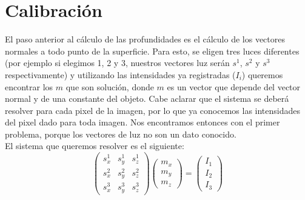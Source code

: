 

\section{Calibración}

El paso anterior al cálculo de las profundidades es el cálculo de los vectores normales a todo punto de la superficie. Para esto, se eligen tres luces diferentes (por ejemplo si elegimos 1, 2 y 3, nuestros vectores luz serán $s^{1}$, $s^{2}$ y $s^{3}$ respectivamente) y utilizando las intensidades ya registradas ($I_i$) queremos encontrar los $m$ que son solución, donde $m$ es un vector que depende del vector normal y de una constante del objeto. Cabe aclarar que el sistema se deberá resolver para cada pixel de la imagen, por lo que ya conocemos las intensidades del pixel dado para toda imagen. Nos encontramos entonces con el primer problema, porque los vectores de luz no son un dato conocido. \\

El sistema que queremos resolver es el siguiente: \\

\[
\begin{pmatrix}
    s_{x}^{1} & s_{y}^{1} & s_{z}^{1} \\
    s_{x}^{2} & s_{y}^{2} & s_{z}^{2} \\
    s_{x}^{3} & s_{y}^{3} & s_{z}^{3}
\end{pmatrix}
\begin{pmatrix}
    m_{x} \\
    m_{y} \\
    m_{z}
\end{pmatrix}
=
\begin{pmatrix}
    I_{1} \\
    I_{2} \\
    I_{3}
\end{pmatrix}
\]

